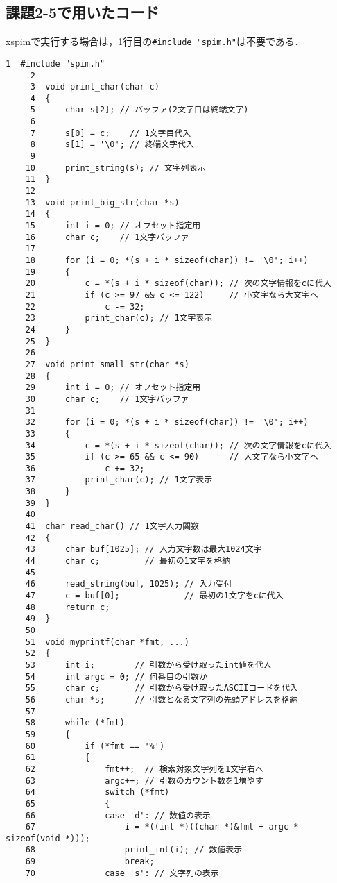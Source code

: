 \subsection{課題2-5で用いたコード} \label{sec:p2-5}
xspimで実行する場合は，1行目の\verb|#include "spim.h"|は不要である．
\begin{Verbatim}[fontsize=\small, baselinestretch=0.8]
     1	#include "spim.h"
     2	
     3	void print_char(char c)
     4	{
     5	    char s[2]; // バッファ(2文字目は終端文字)
     6	
     7	    s[0] = c;    // 1文字目代入
     8	    s[1] = '\0'; // 終端文字代入
     9	
    10	    print_string(s); // 文字列表示
    11	}
    12	
    13	void print_big_str(char *s)
    14	{
    15	    int i = 0; // オフセット指定用
    16	    char c;    // 1文字バッファ
    17	
    18	    for (i = 0; *(s + i * sizeof(char)) != '\0'; i++)
    19	    {
    20	        c = *(s + i * sizeof(char)); // 次の文字情報をcに代入
    21	        if (c >= 97 && c <= 122)     // 小文字なら大文字へ
    22	            c -= 32;
    23	        print_char(c); // 1文字表示
    24	    }
    25	}
    26	
    27	void print_small_str(char *s)
    28	{
    29	    int i = 0; // オフセット指定用
    30	    char c;    // 1文字バッファ
    31	
    32	    for (i = 0; *(s + i * sizeof(char)) != '\0'; i++)
    33	    {
    34	        c = *(s + i * sizeof(char)); // 次の文字情報をcに代入
    35	        if (c >= 65 && c <= 90)      // 大文字なら小文字へ
    36	            c += 32;
    37	        print_char(c); // 1文字表示
    38	    }
    39	}
    40	
    41	char read_char() // 1文字入力関数
    42	{
    43	    char buf[1025]; // 入力文字数は最大1024文字
    44	    char c;         // 最初の1文字を格納
    45	
    46	    read_string(buf, 1025); // 入力受付
    47	    c = buf[0];             // 最初の1文字をcに代入
    48	    return c;
    49	}
    50	
    51	void myprintf(char *fmt, ...)
    52	{
    53	    int i;        // 引数から受け取ったint値を代入
    54	    int argc = 0; // 何番目の引数か
    55	    char c;       // 引数から受け取ったASCIIコードを代入
    56	    char *s;      // 引数となる文字列の先頭アドレスを格納
    57	
    58	    while (*fmt)
    59	    {
    60	        if (*fmt == '%')
    61	        {
    62	            fmt++;  // 検索対象文字列を1文字右へ
    63	            argc++; // 引数のカウント数を1増やす
    64	            switch (*fmt)
    65	            {
    66	            case 'd': // 数値の表示
    67	                i = *((int *)((char *)&fmt + argc * sizeof(void *)));
    68	                print_int(i); // 数値表示
    69	                break;
    70	            case 's': // 文字列の表示

\end{Verbatim}
